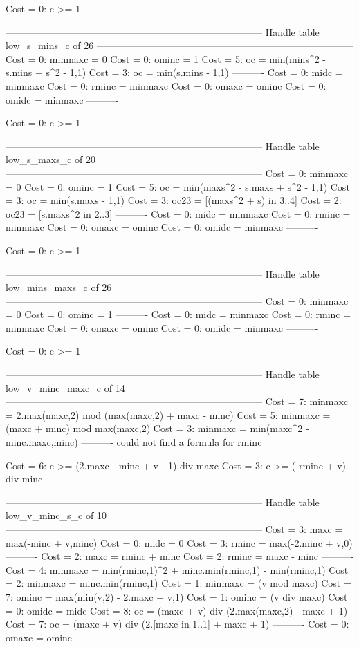 Cost =  0:  c >= 1

--------------------------------------------------------------------------------
Handle table low_s_mins_c of 26
--------------------------------------------------------------------------------
Cost =  0:  minmaxc = 0
Cost =  0:  ominc   = 1
Cost =  5:  oc      = min(mins^2 - s.mins + s^2 - 1,1)
Cost =  3:  oc      = min(s.mins - 1,1)
----------
Cost =  0:  midc    = minmaxc
Cost =  0:  rminc   = minmaxc
Cost =  0:  omaxc   = ominc
Cost =  0:  omidc   = minmaxc
----------

Cost =  0:  c >= 1

--------------------------------------------------------------------------------
Handle table low_s_maxs_c of 20
--------------------------------------------------------------------------------
Cost =  0:  minmaxc = 0
Cost =  0:  ominc   = 1
Cost =  5:  oc      = min(maxs^2 - s.maxs + s^2 - 1,1)
Cost =  3:  oc      = min(s.maxs - 1,1)
Cost =  3:  oc23    = [(maxs^2 + s) in 3..4]
Cost =  2:  oc23    = [s.maxs^2 in 2..3]
----------
Cost =  0:  midc    = minmaxc
Cost =  0:  rminc   = minmaxc
Cost =  0:  omaxc   = ominc
Cost =  0:  omidc   = minmaxc
----------

Cost =  0:  c >= 1

--------------------------------------------------------------------------------
Handle table low_mins_maxs_c of 26
--------------------------------------------------------------------------------
Cost =  0:  minmaxc = 0
Cost =  0:  ominc   = 1
----------
Cost =  0:  midc    = minmaxc
Cost =  0:  rminc   = minmaxc
Cost =  0:  omaxc   = ominc
Cost =  0:  omidc   = minmaxc
----------

Cost =  0:  c >= 1

--------------------------------------------------------------------------------
Handle table low_v_minc_maxc_c of 14
--------------------------------------------------------------------------------
Cost =  7:  minmaxc = 2.max(maxc,2) mod (max(maxc,2) + maxc - minc)
Cost =  5:  minmaxc = (maxc + minc) mod max(maxc,2)
Cost =  3:  minmaxc = min(maxc^2 - minc.maxc,minc)
----------
could not find a formula for rminc

Cost =  6:  c >= (2.maxc - minc + v - 1) div maxc
Cost =  3:  c >= (-rminc + v) div minc

--------------------------------------------------------------------------------
Handle table low_v_minc_s_c of 10
--------------------------------------------------------------------------------
Cost =  3:  maxc    = max(-minc + v,minc)
Cost =  0:  midc    = 0
Cost =  3:  rminc   = max(-2.minc + v,0)
----------
Cost =  2:  maxc    = rminc + minc
Cost =  2:  rminc   = maxc - minc
----------
Cost =  4:  minmaxc = min(rminc,1)^2 + minc.min(rminc,1) - min(rminc,1)
Cost =  2:  minmaxc = minc.min(rminc,1)
Cost =  1:  minmaxc = (v mod maxc)
Cost =  7:  ominc   = max(min(v,2) - 2.maxc + v,1)
Cost =  1:  ominc   = (v div maxc)
Cost =  0:  omidc   = midc
Cost =  8:  oc      = (maxc + v) div (2.max(maxc,2) - maxc + 1)
Cost =  7:  oc      = (maxc + v) div (2.[maxc in 1..1] + maxc + 1)
----------
Cost =  0:  omaxc   = ominc
----------

